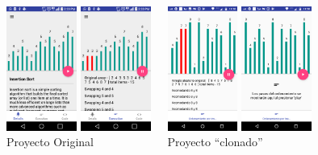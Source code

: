 \begin{frame}
\begin{columns}[c] %
\begin{center}
\includegraphics[width=2.3cm]{Plagio/Piratazo_Orig1}\hspace{0.05cm}
\includegraphics[width=2.3cm]{Plagio/Piratazo_Orig2}\\
Proyecto Original
\end{center}
\begin{center}
\includegraphics[width=2.3cm]{Plagio/Piratazo_Oscar1}\hspace{0.05cm}
\includegraphics[width=2.3cm]{Plagio/Piratazo_Oscar2}\\
Proyecto ``clonado''
\end{center}	
\end{columns}
\end{frame}

